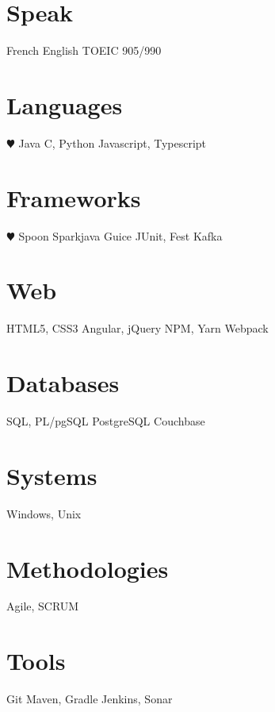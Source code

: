 \documentclass[hidelinks]{cv-style}          %
\begin{document}

\begin{aside}
\section{Speak}
French
English
TOEIC 905/990
%
\section{Languages}
{\color{red} $\varheartsuit$} Java
C, Python
Javascript, Typescript
\section{Frameworks}
{\color{red} $\varheartsuit$} Spoon
Sparkjava
Guice
JUnit, Fest
Kafka
\section{Web}
HTML5, CSS3
Angular, jQuery
NPM, Yarn
Webpack
\section{Databases}
SQL, PL/pgSQL
PostgreSQL
Couchbase 
\section{Systems}
Windows, Unix	
\section{Methodologies}
Agile, SCRUM
\section{Tools}
Git
Maven, Gradle
Jenkins, Sonar
%
\end{aside}






\end{document}
